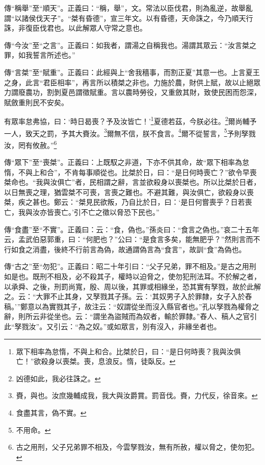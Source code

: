 {\noindent\zhuan{}\fzbyks 傳“稱舉”至“順天”。正義曰：“稱，舉”，文。常法以臣伐君，則為亂逆，故舉亂謂“以諸侯伐天子”。“桀有昏德”，宣三年文。以有昏德，天命誅之，今乃順天行誅，非復臣伐君也。以此解眾人守常之意也。 \par}

{\noindent\zhuan{}\fzbyks 傳“今汝”至“之言”。正義曰：如我者，謂湯之自稱我也。湯謂其眾云：“汝言桀之罪，如我誓言所述也。” \par}

{\noindent\zhuan{}\fzbyks 傳“言桀”至“賦重”。正義曰：此經與上“舍我穡事，而割正夏”其意一也。上言夏王之身，此言“君臣相率”，再言所以積桀之非也。力施於農，財供上賦，故以止絕眾力謂廢農功，割剝夏邑謂徵賦重。言以農時勞役，又重斂其財，致使民困而怨深，賦斂重則民不安矣。 \par}

有眾率怠弗協，曰：‘時日曷喪？予及汝皆亡！’\footnote{眾下相率為怠惰，不與上和合。比桀於日，曰：“是日何時喪？我與汝俱亡！”欲殺身以喪桀。喪，息浪反。惰，徒臥反。}夏德若茲，今朕必往。\footnote{凶德如此，我必往誅之。}爾尚輔予一人，致天之罰，予其大賚汝。\footnote{賚，與也。汝庶幾輔成我，我大與汝爵賞。罰音伐。賚，力代反，徐音來。}爾無不信，朕不食言。\footnote{食盡其言，偽不實。}爾不從誓言，\footnote{不用命。}予則孥戮汝，罔有攸赦。”\footnote{古之用刑，父子兄弟罪不相及，今雲孥戮汝，無有所赦，權以脅之，使勿犯。}

{\noindent\zhuan{}\fzbyks 傳“眾下”至“喪桀”。正義曰：上既馭之非道，下亦不供其命，故“眾下相率為怠惰，不與上和合”，不肯每事順從也。比桀於日，曰：“是日何時喪亡？”欲令早喪桀命也。“我與汝俱亡”者，民相謂之辭，言並欲殺身以喪桀也。所以比桀於日者，以日無喪之理，猶雲桀不可喪，言喪之難也。不避其難，與汝俱亡，欲殺身以喪桀，疾之甚也。鄭云：“桀見民欲叛，乃自比於日，曰：‘是日何嘗喪乎？日若喪亡，我與汝亦皆喪亡。’引不亡之徵以脅恐下民也。” \par}

{\noindent\zhuan{}\fzbyks 傳“食盡”至“不實”。正義曰：云：“食，偽也。”孫炎曰：“食言之偽也。”哀二十五年云，孟武伯惡郭重，曰：“何肥也？”公曰：“是食言多矣，能無肥乎？”然則言而不行如食之消盡，後終不行前言為偽，故通謂偽言為“食言”，故訓“食”為偽也。 \par}

{\noindent\zhuan{}\fzbyks 傳“古之”至“勿犯”。正義曰：昭二十年引曰：“父子兄弟，罪不相及。”是古之用刑如是也。既刑不相及，必不殺其子，權時以迫脅之，使勿犯刑法耳。不於解之者，以承舜、之後，刑罰尚寬，殷、周以後，其罪或相緣坐，恐其實有孥戮，故於此解之。云：“大罪不止其身，又孥戮其子孫。云：‘其奴男子入於罪隸，女子入於舂稿。’”鄭意以為實戮其子，故注云：“奴謂從坐而沒入縣官者也。”孔以孥戮為權脅之辭，則所云非從坐也。云：“謂坐為盜賊而為奴者，輸於罪隸。”舂人、稿人之官引此“孥戮汝”。又引云：“為之奴。”或如眾言，別有沒入，非緣坐者也。 \par}

